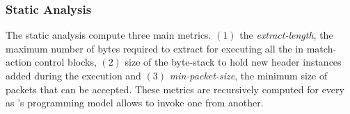 \documentclass[letterpaper,twocolumn,10pt]{article}
\begin{document}
% 
%  
% 
 
\subsubsection{Static Analysis}
\label{subsubsection:static-analysis}
The static analysis compute three main metrics. $(1)$ the  
\emph{extract-length}, the maximum number of bytes required to extract 
for executing all the \uprograms in match-action control blocks, 
$(2)$ size of the byte-stack to hold new header instances added during 
the execution and $(3)$ \emph{min-packet-size}, the minimum size of 
packets that can be accepted. These metrics are recursively computed 
for every \uprogram as \uswitch's programming model allows to invoke 
one \uprogram from another. 
\end{document}
